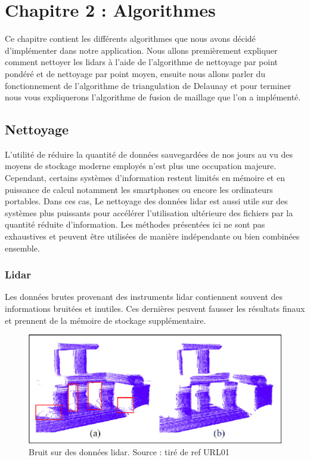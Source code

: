 \chapter{Chapitre 2 : Algorithmes}

Ce chapitre contient les différents algorithmes que nous avons décidé d'implémenter dans notre application.
Nous allons premièrement expliquer comment nettoyer les lidars à l'aide de
l'algorithme de nettoyage par point pondéré et de nettoyage par point moyen,
ensuite nous allons parler du fonctionnement de l'algorithme de triangulation de 
Delaunay et pour terminer nous vous expliquerons l'algorithme de fusion de 
maillage que l'on a implémenté.

\section{Nettoyage}

L'utilité de réduire la quantité de données sauvegardées de nos jours au vu des 
moyens de stockage moderne employés n'est plus une occupation majeure.
Cependant, certains systèmes d'information restent limités en mémoire et en
puissance de calcul notamment les smartphones ou encore les ordinateurs portables.
Dans ces cas, 
Le nettoyage des données \gls{lidar} est aussi utile sur des systèmes plus puissants
pour accélérer l'utilisation ultérieure des fichiers par la quantité réduite
d'information.
Les méthodes présentées ici ne sont pas exhaustives et peuvent être utilisées
de manière indépendante ou bien combinées ensemble.

\subsection{Lidar}

Les données brutes provenant des instruments \gls{lidar} contiennent souvent
des informations bruitées et inutiles.
Ces dernières peuvent fausser les résultats finaux et prennent de la mémoire
de stockage supplémentaire.

\begin{figure}[htbp!]
    \centering
    \includegraphics[width=0.8\linewidth]{figures/lidar noise.png}
    \caption{Bruit sur des données lidar. Source : tiré de ref URL01}
	\label{fig:lidar_noise}
\end{figure}

